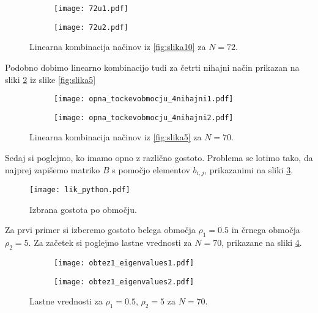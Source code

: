 \documentclass[12pt,a4paper]{article}
\begin{document}
\begin{figure}[H]
    \centering
    \begin{subfigure}[b]{0.49\textwidth}
        \texttt{[image: 72u1.pdf]}
    \end{subfigure}
    \begin{subfigure}[b]{0.49\textwidth}
        \texttt{[image: 72u2.pdf]}
    \end{subfigure}
    \caption{Linearna kombinacija načinov iz \ref{fig:slika10} za $N=72$.} \label{fig:slika11}
\end{figure}

\noindent Podobno dobimo linearno kombinacijo  tudi za četrti nihajni način prikazan na sliki \ref{fig:slika12}  iz slike \ref{fig:slika5}

\begin{figure}[H]
    \centering
    \begin{subfigure}[b]{0.49\textwidth}
        \texttt{[image: opna\_tockevobmocju\_4nihajni1.pdf]}
    \end{subfigure}
    \begin{subfigure}[b]{0.49\textwidth}
        \texttt{[image: opna\_tockevobmocju\_4nihajni2.pdf]}
    \end{subfigure}
    \caption{Linearna kombinacija načinov iz \ref{fig:slika5} za $N=70$.} \label{fig:slika12}
\end{figure}

Sedaj si poglejmo, ko imamo opno z različno gostoto. Problema se lotimo tako, da najprej zapišemo matriko $B$ s pomočjo elementov $b_{i,j}$, prikazanimi na sliki \ref{fig:slika13}.

\begin{figure}[H]
\begin{center}
\texttt{[image: lik\_python.pdf]}
\caption{Izbrana gostota po območju.} \label{fig:slika13}
\end{center}
\end{figure}

\noindent Za prvi primer si izberemo gostoto belega območja $\rho_1= 0.5$ in črnega območja $\rho_2=5$. Za začetek si poglejmo lastne vrednosti za $N=70$, prikazane na sliki \ref{fig:slika14}.

\begin{figure}[H]
    \centering
    \begin{subfigure}[b]{0.49\textwidth}
        \texttt{[image: obtez1\_eigenvalues1.pdf]}
    \end{subfigure}
    \begin{subfigure}[b]{0.49\textwidth}
        \texttt{[image: obtez1\_eigenvalues2.pdf]}
    \end{subfigure}
    \caption{Lastne vrednosti za $\rho_1= 0.5$, $\rho_2=5$ za $N=70$.} \label{fig:slika14}
\end{figure}
\end{document}
